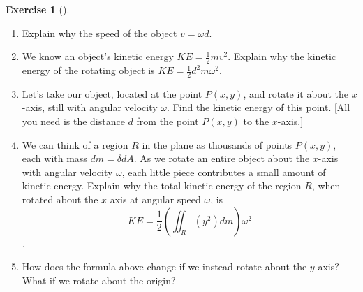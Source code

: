 \documentclass[10pt,]{book}
\theoremstyle{plain}
\theoremstyle{definition}
\theoremstyle{definition}
\theoremstyle{definition}
\theoremstyle{definition}
\newtheorem{exploration}[project]{Exercise}
\theoremstyle{definition}
\numberwithin{equation}{section}
\begin{document}
\begin{exploration}[]\label{exploration-262}
\leavevmode%
\begin{enumerate}[font=\bfseries,label=(\alph*),ref=\alph*]
\item\label{task-709} Explain why the speed of the object \(v=\omega d\).%
\item\label{task-710} We know an object's kinetic energy \(KE=\frac{1}{2}mv^2\). Explain why the kinetic energy of the rotating object is \(KE = \frac{1}{2}d^2m\omega^2\).%
\item\label{task-711} Let's take our object, located at the point \(P(x,y)\), and rotate it about the \(x\)-axis, still with angular velocity \(\omega\). Find the kinetic energy of this point. [All you need is the distance \(d\) from the point \(P(x,y)\) to the \(x\)-axis.]%
\item\label{task-712} We can think of a region \(R\) in the plane as thousands of points \(P(x,y)\), each with mass \(dm=\delta dA\). As we rotate an entire object about the \(x\)-axis with angular velocity \(\omega\), each little piece contributes a small amount of kinetic energy. Explain why the total kinetic energy of the region \(R\), when rotated about the \(x\) axis at angular speed \(\omega\), is %
\begin{equation*}
KE= \frac{1}{2}\left(\iint_R (y^2)dm\right)\omega^2
\end{equation*}
.%
\item\label{task-713} How does the formula above change if we instead rotate about the \(y\)-axis? What if we rotate about the origin? %
\end{enumerate}
\end{exploration}
\typeout{************************************************}
\typeout{************************************************}
\end{document}
